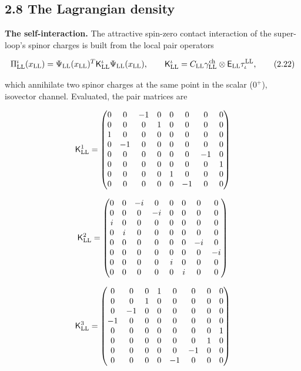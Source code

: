 \documentclass[
  10pt,
]{article}
\begin{document}
\hypertarget{the-lagrangian-density}{%
\subsection{2.8 The Lagrangian density}\label{the-lagrangian-density}}

\textbf{The self-interaction.} The attractive spin-zero contact
interaction of the super-loop's spinor charges is built from the local
pair operators

\[\Pi^\iota_{\rm LL}(x_{\rm LL})=\Psi_{\rm LL}(x_{\rm LL})^T\mathsf K^\iota_{\rm LL}\Psi_{\rm LL}(x_{\rm LL}),\qquad\mathsf K^\iota_{\rm LL}=C_{\rm LL}\gamma^{\rm ch}_{\rm LL}\otimes\mathsf E_{\rm LL}\tau^{\rm LL}_\iota,\tag{2.22}\]

which annihilate two spinor charges at the same point in the scalar
(\(0^+\)), isovector channel. Evaluated, the pair matrices are

\[\mathsf K^1_{\rm LL}=\begin{pmatrix}0&0&-1&0&0&0&0&0\\0&0&0&1&0&0&0&0\\1&0&0&0&0&0&0&0\\0&-1&0&0&0&0&0&0\\0&0&0&0&0&0&-1&0\\0&0&0&0&0&0&0&1\\0&0&0&0&1&0&0&0\\0&0&0&0&0&-1&0&0\end{pmatrix}\]

\[\mathsf K^2_{\rm LL}=\begin{pmatrix}0&0&-i&0&0&0&0&0\\0&0&0&-i&0&0&0&0\\i&0&0&0&0&0&0&0\\0&i&0&0&0&0&0&0\\0&0&0&0&0&0&-i&0\\0&0&0&0&0&0&0&-i\\0&0&0&0&i&0&0&0\\0&0&0&0&0&i&0&0\end{pmatrix}\]

\[\mathsf K^3_{\rm LL}=\begin{pmatrix}0&0&0&1&0&0&0&0\\0&0&1&0&0&0&0&0\\0&-1&0&0&0&0&0&0\\-1&0&0&0&0&0&0&0\\0&0&0&0&0&0&0&1\\0&0&0&0&0&0&1&0\\0&0&0&0&0&-1&0&0\\0&0&0&0&-1&0&0&0\end{pmatrix}\]
\end{document}
